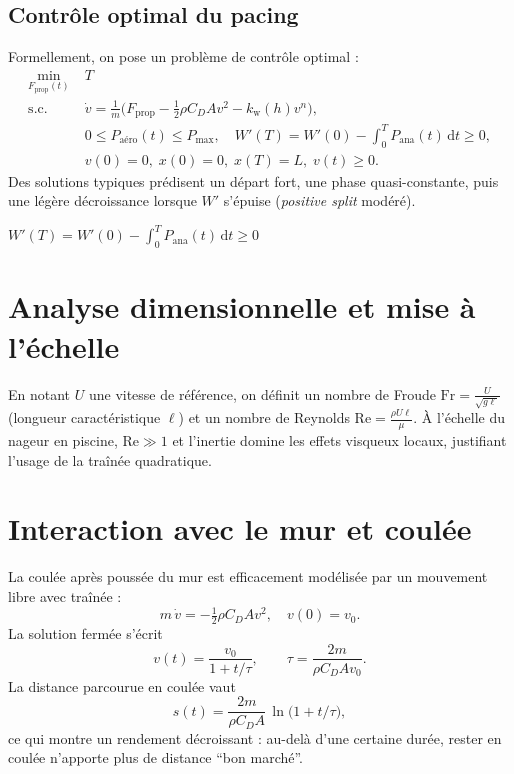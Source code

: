 \documentclass[12pt,a4paper]{article}
\newcommand{\dd}{\mathrm{d}}
\begin{document}
\subsection{Contrôle optimal du pacing}
Formellement, on pose un problème de contrôle optimal :
\begin{align}
 \min_{F_{\mathrm{prop}}(t)}\; &T \\
 \text{s.c. }\; &\dot v = \frac{1}{m}\Big(F_{\mathrm{prop}} - \tfrac{1}{2}\rho C_D A v^2 - k_\mathrm{w}(h)v^n\Big), \\
 &0\le P_\mathrm{aéro}(t)\le P_{\max},\quad W'(T)=W'(0)-\int_0^T P_\mathrm{ana}(t)\,\dd t\ge 0, \\
 &v(0)=0,\; x(0)=0,\; x(T)=L,\; v(t)\ge 0.
 \end{align}
Des solutions typiques prédisent un départ fort, une phase quasi-constante, puis une légère décroissance lorsque $W'$ s'épuise (\emph{positive split} modéré).

$W'(T)=W'(0)-\int_0^T P_\mathrm{ana}(t)\,\dd t\ge 0$

\section{Analyse dimensionnelle et mise à l'échelle}
En notant $U$ une vitesse de référence, on définit un nombre de Froude $\mathrm{Fr}=\frac{U}{\sqrt{g\ell}}$ (longueur caractéristique $\ell$) et un nombre de Reynolds $\mathrm{Re}=\frac{\rho U \ell}{\mu}$. À l'échelle du nageur en piscine, $\mathrm{Re}\gg 1$ et l'inertie domine les effets visqueux locaux, justifiant l'usage de la traînée quadratique.

\section{Interaction avec le mur et coulée}
La coulée après poussée du mur est efficacement modélisée par un mouvement libre avec traînée :
\begin{equation}
 m\,\dot v = - \tfrac{1}{2}\rho C_D A v^2, \quad v(0)=v_0.
 \end{equation}
La solution fermée s'écrit
\begin{equation}
 v(t) = \frac{v_0}{1+ t/\tau}, \qquad \tau = \frac{2m}{\rho C_D A v_0}.
 \end{equation}
La distance parcourue en coulée vaut
\begin{equation}
 s(t) = \frac{2m}{\rho C_D A}\,\ln\big(1+t/\tau\big),
 \end{equation}
ce qui montre un rendement décroissant : au-delà d'une certaine durée, rester en coulée n'apporte plus de distance ``bon marché''.
\end{document}
